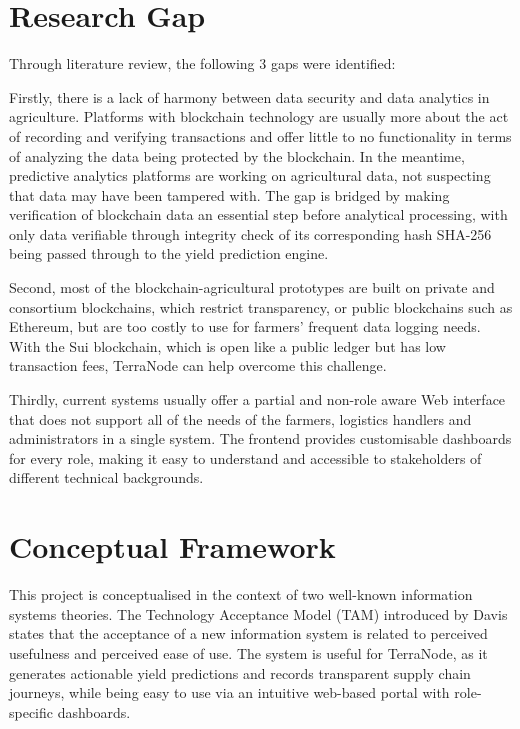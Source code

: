 \section{Research Gap}

Through literature review, the following 3 gaps were identified:

Firstly, there is a lack of harmony between data security and data analytics in agriculture. Platforms with blockchain technology are usually more about the act of recording and verifying transactions and offer little to no functionality in terms of analyzing the data being protected by the blockchain. In the meantime, predictive analytics platforms are working on agricultural data, not suspecting that data may have been tampered with. The gap is bridged by making verification of blockchain data an essential step before analytical processing, with only data verifiable through integrity check of its corresponding hash SHA-256 being passed through to the yield prediction engine.

Second, most of the blockchain-agricultural prototypes are built on private and consortium blockchains, which restrict transparency, or public blockchains such as Ethereum, but are too costly to use for farmers' frequent data logging needs. With the Sui blockchain, which is open like a public ledger but has low transaction fees, TerraNode can help overcome this challenge.

Thirdly, current systems usually offer a partial and non-role aware Web interface that does not support all of the needs of the farmers, logistics handlers and administrators in a single system. The frontend provides customisable dashboards for every role, making it easy to understand and accessible to stakeholders of different technical backgrounds.

\section{Conceptual Framework}

This project is conceptualised in the context of two well-known information systems theories. The Technology Acceptance Model (TAM) introduced by Davis states that the acceptance of a new information system is related to perceived usefulness and perceived ease of use. The system is useful for TerraNode, as it generates actionable yield predictions and records transparent supply chain journeys, while being easy to use via an intuitive web-based portal with role-specific dashboards.

